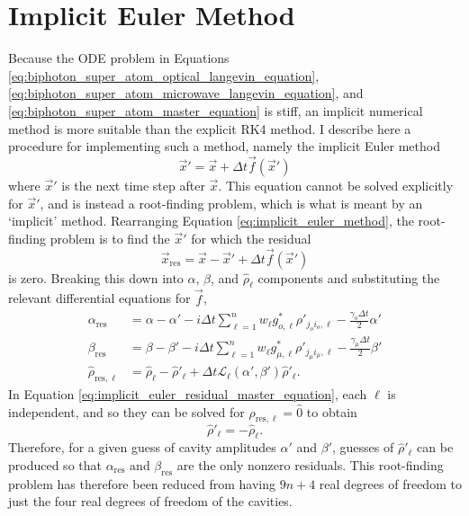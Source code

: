 \section{\label{sec:implicit_euler}Implicit Euler Method}
Because the ODE problem in Equations \ref{eq:biphoton_super_atom_optical_langevin_equation}, \ref{eq:biphoton_super_atom_microwave_langevin_equation}, and \ref{eq:biphoton_super_atom_master_equation} is stiff, an implicit numerical method is more suitable than the explicit RK4 method. I describe here a procedure for implementing such a method, namely the implicit Euler method
\begin{equation}
    \vec{x}' = \vec{x} + \Delta t\vec{f}(\vec{x}') \label{eq:implicit_euler_method}
\end{equation}
where $\vec{x}'$ is the next time step after $\vec{x}$. This equation cannot be solved explicitly for $\vec{x}'$, and is instead a root-finding problem, which is what is meant by an `implicit' method. Rearranging Equation \ref{eq:implicit_euler_method}, the root-finding problem is to find the $\vec{x}'$ for which the residual
\begin{equation}
    \vec{x}_\text{res} = \vec{x} - \vec{x}' + \Delta t\vec{f}(\vec{x}') \label{eq:implicit_euler_residual}
\end{equation}
is zero. Breaking this down into $\alpha$, $\beta$, and $\hat{\rho}_\ell$ components and substituting the relevant differential equations for $\vec{f}$,
\begin{align}
    \alpha_\text{res} &= \alpha - \alpha' - i\Delta t\sum_{\ell=1}^{n} w_\ell g_{o,\ell}^*\rho'_{j_oi_o,\ell} - \frac{\gamma_o\Delta t}{2}\alpha'\\
    \beta_\text{res} &= \beta - \beta' - i\Delta t\sum_{\ell=1}^{n} w_\ell g_{\mu,\ell}^*\rho'_{j_\mu i_\mu,\ell} - \frac{\gamma_\mu\Delta t}{2}\beta'\\
    \hat{\rho}_{\text{res},\ell} &= \hat{\rho}_{\ell} - \hat{\rho}'_{\ell} + \Delta t\mathcal{L}_{\ell}(\alpha', \beta')\hat{\rho}'_{\ell}. \label{eq:implicit_euler_residual_master_equation}
\end{align}
In Equation \ref{eq:implicit_euler_residual_master_equation}, each $\ell$ is independent, and so they can be solved for $\hat{\rho}_{\text{res},\ell} = \hat{0}$ to obtain
\begin{equation}
    [\Delta t\mathcal{L}_{\ell}(\alpha', \beta')-\mathds{1}]\hat{\rho}'_{\ell} = -\hat{\rho}_{\ell}.
\end{equation}
Therefore, for a given guess of cavity amplitudes $\alpha'$ and $\beta'$, guesses of $\hat{\rho}'_{\ell}$ can be produced so that $\alpha_\text{res}$ and $\beta_\text{res}$ are the only nonzero residuals. This root-finding problem has therefore been reduced from having $9n+4$ real degrees of freedom to just the four real degrees of freedom of the cavities.
